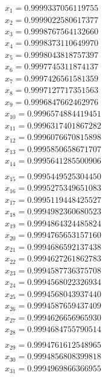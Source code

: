 \begin{multicols}{3}
	\begin{align*}
		x_{1}  = 0.9999337056119755\\
		x_{2}  = 0.9999022580617377\\
		x_{3}  = 0.9998767564132660\\
		x_{4}  = 0.9998373110649970\\
		x_{5}  = 0.9998043818757397\\
		x_{6}  = 0.9997745311874137\\
		x_{7}  = 0.9997426561581359\\
		x_{8}  = 0.9997127717351563\\
		x_{9}  = 0.9996847662462976\\
		x_{10} = 0.9996574884419451\\
		x_{11} = 0.9996317401867282\\
		x_{12} = 0.9996076670815898\\
		x_{13} = 0.9995850658671707\\
		x_{14} = 0.9995641285500906\\
	\end{align*}
	\vfill
	\columnbreak
	\begin{align*}
		x_{15} = 0.9995449525304450\\
		x_{16} = 0.9995275349651083\\
		x_{17} = 0.9995119448425527\\
		x_{18} = 0.9994982360680523\\
		x_{19} = 0.9994864324485824\\
		x_{20} = 0.9994765653157160\\
		x_{21} = 0.9994686592137438\\
		x_{22} = 0.9994627261862783\\
		x_{23} = 0.9994587736375708\\
		x_{24} = 0.9994568022326934\\
		x_{25} = 0.9994568043937440\\
		x_{26} = 0.9994587659437409\\
		x_{27} = 0.9994626656965930\\
		x_{28} = 0.9994684755790514\\
	\end{align*}
	\vfill
	\columnbreak
	\begin{align*}
		x_{29} = 0.9994761612548965\\
		x_{30} = 0.9994856808399818\\
		x_{31} = 0.9994969866366955\\

\end{align*}
\end{multicols}
